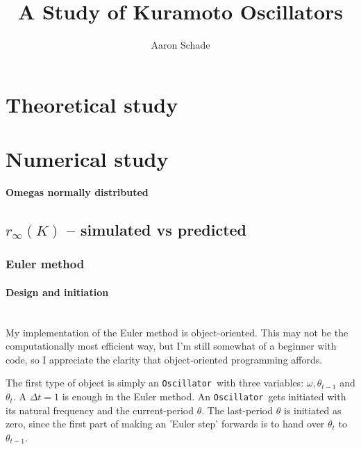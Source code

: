 \documentclass[11pt,a4paper]{article}
\title{\vspace{30mm}\huge \bfseries A Study of Kuramoto Oscillators}
\author{Aaron Schade}
\newcommand{\osc}{\texttt{Oscillator}~}
\newcommand{\para}[1]{\paragraph{#1}\mbox{}\\}
\begin{document}


\maketitle
\vfill
\tableofcontents
\vfill


\clearpage{}
\section{Theoretical study}















\section{Numerical study}

{\Large\textbf{Omegas normally distributed}}
\subsection{$r_{\infty}(K)$ -- simulated vs predicted}


\subsubsection{Euler method}

\para{Design and initiation}
My implementation of the Euler method is object-oriented. 
This may not be the computationally most efficient way, but I'm still somewhat of a beginner with code, so I appreciate the clarity that object-oriented programming affords.

The first type of object is simply an \osc with three variables: $\omega, \theta_{t-1}$ and $\theta_t$. 
A $\Delta t = 1$ is enough in the Euler method.
An \osc gets initiated with its natural frequency and the current-period $\theta$. 
The last-period $\theta$ is initiated as zero, since the first part of making an 'Euler step' forwards is to hand over $\theta_{t}$ to $\theta_{t-1}$. 
\end{document}
